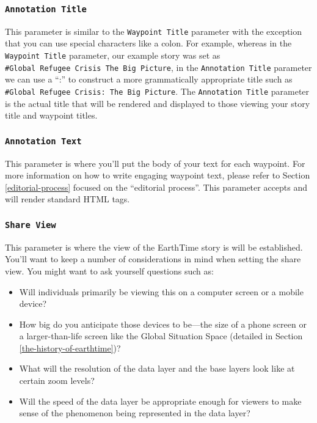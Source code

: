 \documentclass[
  12pt,
]{krantz}
\providecommand{\tightlist}{%
  \setlength{\itemsep}{0pt}\setlength{\parskip}{0pt}}
\begin{document}
\hypertarget{annotation-title}{%
\subsubsection*{\texorpdfstring{\texttt{Annotation\ Title}}{Annotation Title}}\label{annotation-title}}


This parameter is similar to the \texttt{Waypoint\ Title} parameter with the exception that you can use special characters like a colon. For example, whereas in the \texttt{Waypoint\ Title} parameter, our example story was set as \texttt{\#Global\ Refugee\ Crisis\ The\ Big\ Picture}, in the \texttt{Annotation\ Title} parameter we can use a ``:'' to construct a more grammatically appropriate title such as \texttt{\#Global\ Refugee\ Crisis:\ The\ Big\ Picture}. The \texttt{Annotation\ Title} parameter is the actual title that will be rendered and displayed to those viewing your story title and waypoint titles.

\hypertarget{annotation-text}{%
\subsubsection*{\texorpdfstring{\texttt{Annotation\ Text}}{Annotation Text}}\label{annotation-text}}


This parameter is where you'll put the body of your text for each waypoint. For more information on how to write engaging waypoint text, please refer to Section \ref{editorial-process} focused on the ``editorial process''. This parameter accepts and will render standard HTML tags.

\hypertarget{share-view}{%
\subsubsection*{\texorpdfstring{\texttt{Share\ View}}{Share View}}\label{share-view}}


This parameter is where the view of the EarthTime story is will be established. You'll want to keep a number of considerations in mind when setting the share view. You might want to ask yourself questions such as:

\begin{itemize}
\tightlist
\item
  Will individuals primarily be viewing this on a computer screen or a mobile device?
\item
  How big do you anticipate those devices to be---the size of a phone screen or a larger-than-life screen like the Global Situation Space (detailed in Section \ref{the-history-of-earthtime})?
\item
  What will the resolution of the data layer and the base layers look like at certain zoom levels?
\item
  Will the speed of the data layer be appropriate enough for viewers to make sense of the phenomenon being represented in the data layer?
\end{itemize}
\end{document}

